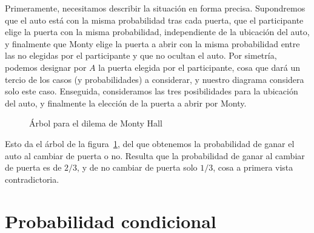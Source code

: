   Primeramente,
  necesitamos describir la situación en forma precisa.
  Supondremos que el auto está con la misma probabilidad tras cada puerta,
  que el participante elige la puerta con la misma probabilidad,
  independiente de la ubicación del auto,
  y finalmente que Monty elige la puerta a abrir con la misma probabilidad
  entre las no elegidas por el participante y que no ocultan el auto.
  Por simetría,
  podemos designar por \(A\) la puerta elegida por el participante,
  cosa que dará un tercio de los casos
  (y probabilidades) a considerar,
  y nuestro diagrama considera solo este caso.
  Enseguida,
  consideramos las tres posibilidades para la ubicación del auto,
  y finalmente la elección de la puerta a abrir por Monty.
  \begin{figure}[ht]
    \centering
    \caption{Árbol para el dilema de Monty Hall}
    \label{fig:monty-hall}
  \end{figure}
  Esto da el árbol de la figura~\ref{fig:monty-hall},
  del que obtenemos la probabilidad de ganar el auto
  al cambiar de puerta o no.
  Resulta que la probabilidad de ganar al cambiar de puerta
  es de \(2/3\),
  y de no cambiar de puerta solo \(1/3\),
  cosa a primera vista contradictoria.

\section{Probabilidad condicional}
\label{sec:probabilidad-condicional}

